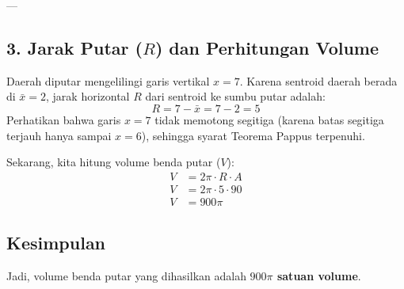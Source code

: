 \documentclass[12pt,a4paper]{article}
\begin{document}
---

\subsection*{3. Jarak Putar ($R$) dan Perhitungan Volume}
Daerah diputar mengelilingi garis vertikal $x = 7$. Karena sentroid daerah berada di $\bar{x} = 2$, jarak horizontal $R$ dari sentroid ke sumbu putar adalah:
\begin{equation*}
  R = 7 - \bar{x} = 7 - 2 = 5
\end{equation*}
Perhatikan bahwa garis $x = 7$ tidak memotong segitiga (karena batas segitiga terjauh hanya sampai $x = 6$), sehingga syarat Teorema Pappus terpenuhi.

Sekarang, kita hitung volume benda putar ($V$):
\begin{align*}
  V &= 2\pi \cdot R \cdot A \\
  V &= 2\pi \cdot 5 \cdot 90 \\
  V &= 900\pi
\end{align*}

\subsection*{Kesimpulan}
Jadi, volume benda putar yang dihasilkan adalah \textbf{$900\pi$ satuan volume}.
\end{document}
